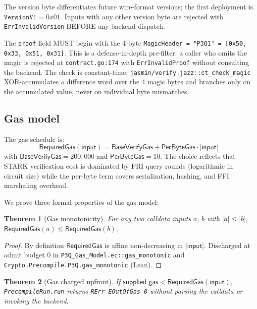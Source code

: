 \documentclass[11pt,a4paper]{article}
\newtheorem{theorem}{Theorem}
\begin{document}
The version byte differentiates future wire-format versions; the
first deployment is $\texttt{VersionV1} = 0x01$. Inputs with any
other version byte are rejected with \texttt{ErrInvalidVersion}
BEFORE any backend dispatch.

The \texttt{proof} field MUST begin with the 4-byte
\texttt{MagicHeader = "P3Q1" = [0x50, 0x33, 0x51, 0x31]}. This is
a defense-in-depth pre-filter: a caller who omits the magic is
rejected at \texttt{contract.go:174} with \texttt{ErrInvalidProof}
without consulting the backend. The check is constant-time:
\texttt{jasmin/verify.jazz::ct\_check\_magic} XOR-accumulates a
difference word over the 4 magic bytes and branches only on the
accumulated value, never on individual byte mismatches.

\subsection{Gas model}\label{sec:gas}

The gas schedule is:
\[
\mathsf{RequiredGas}(\mathsf{input}) =
  \mathsf{BaseVerifyGas} + \mathsf{PerByteGas} \cdot |\mathsf{input}|
\]
with $\mathsf{BaseVerifyGas} = 200{,}000$ and
$\mathsf{PerByteGas} = 10$. The choice reflects that STARK verification
cost is dominated by FRI query rounds (logarithmic in circuit size)
while the per-byte term covers serialization, hashing, and FFI
marshaling overhead.

We prove three formal properties of the gas model:

\begin{theorem}[Gas monotonicity]\label{thm:gas-mono}
For any two calldata inputs $a$, $b$ with $|a| \le |b|$,
$\mathsf{RequiredGas}(a) \le \mathsf{RequiredGas}(b)$.
\end{theorem}

\begin{proof}
By definition $\mathsf{RequiredGas}$ is affine non-decreasing in
$|\mathsf{input}|$. Discharged at admit budget $0$ in
\texttt{P3Q\_Gas\_Model.ec::gas\_monotonic} and
\texttt{Crypto.Precompile.P3Q.gas\_monotonic} (Lean).
\end{proof}

\begin{theorem}[Gas charged upfront]\label{thm:gas-upfront}
If $\mathsf{supplied\_gas} < \mathsf{RequiredGas}(\mathsf{input})$,
\texttt{PrecompileRun.run} returns \texttt{RErr EOutOfGas 0} without
parsing the calldata or invoking the backend.
\end{theorem}
\end{document}
